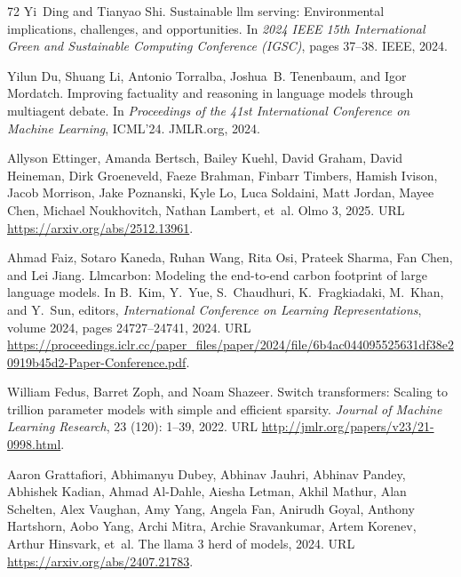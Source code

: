 \begin{thebibliography}{72}
Yi~Ding and Tianyao Shi.
\newblock Sustainable llm serving: Environmental implications, challenges, and opportunities.
\newblock In \emph{2024 IEEE 15th International Green and Sustainable Computing Conference (IGSC)}, pages 37--38. IEEE, 2024.

Yilun Du, Shuang Li, Antonio Torralba, Joshua~B. Tenenbaum, and Igor Mordatch.
\newblock Improving factuality and reasoning in language models through multiagent debate.
\newblock In \emph{Proceedings of the 41st International Conference on Machine Learning}, ICML'24. JMLR.org, 2024.

Allyson Ettinger, Amanda Bertsch, Bailey Kuehl, David Graham, David Heineman, Dirk Groeneveld, Faeze Brahman, Finbarr Timbers, Hamish Ivison, Jacob Morrison, Jake Poznanski, Kyle Lo, Luca Soldaini, Matt Jordan, Mayee Chen, Michael Noukhovitch, Nathan Lambert, et~al.
\newblock Olmo 3, 2025.
\newblock URL \url{https://arxiv.org/abs/2512.13961}.

Ahmad Faiz, Sotaro Kaneda, Ruhan Wang, Rita Osi, Prateek Sharma, Fan Chen, and Lei Jiang.
\newblock Llmcarbon: Modeling the end-to-end carbon footprint of large language models.
\newblock In B.~Kim, Y.~Yue, S.~Chaudhuri, K.~Fragkiadaki, M.~Khan, and Y.~Sun, editors, \emph{International Conference on Learning Representations}, volume 2024, pages 24727--24741, 2024.
\newblock URL \url{https://proceedings.iclr.cc/paper_files/paper/2024/file/6b4ac044095525631df38e20919b45d2-Paper-Conference.pdf}.

William Fedus, Barret Zoph, and Noam Shazeer.
\newblock Switch transformers: Scaling to trillion parameter models with simple and efficient sparsity.
\newblock \emph{Journal of Machine Learning Research}, 23 (120): 1--39, 2022.
\newblock URL \url{http://jmlr.org/papers/v23/21-0998.html}.

Aaron Grattafiori, Abhimanyu Dubey, Abhinav Jauhri, Abhinav Pandey, Abhishek Kadian, Ahmad Al-Dahle, Aiesha Letman, Akhil Mathur, Alan Schelten, Alex Vaughan, Amy Yang, Angela Fan, Anirudh Goyal, Anthony Hartshorn, Aobo Yang, Archi Mitra, Archie Sravankumar, Artem Korenev, Arthur Hinsvark, et~al.
\newblock The llama 3 herd of models, 2024.
\newblock URL \url{https://arxiv.org/abs/2407.21783}.


\end{thebibliography}
